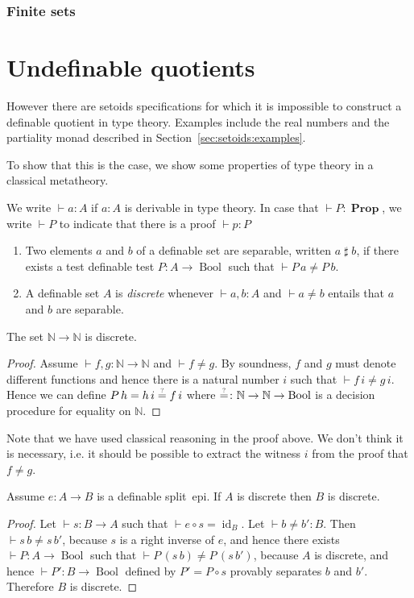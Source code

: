 \documentclass[envcountsame]{llncs}
\newcommand{\N}{\mathbb{N}}
\DeclareMathOperator{\Prop}{\mathbf{Prop}}
\DeclareMathOperator{\Bool}{Bool}
\DeclareMathOperator{\id}{id}
\newcommand{\eqqm}{\overset{\text{\tiny ?}}{=}}
\newcommand{\sep}{\mathrel{\sharp}}
\begin{document}
\subsubsection*{Finite sets}


\section{Undefinable quotients}
However there are setoids specifications for which it is impossible to construct a definable quotient in type theory. Examples include the real numbers and the partiality monad described in Section~\ref{sec:setoids:examples}.

To show that this is the case, we show some properties of type theory in a classical metatheory.

We write $\vdash a\colon A$ if $a\colon A$ is derivable in type theory. In case that $\vdash P\colon \Prop$, we write $\vdash P$ to indicate that there is a proof $\vdash p\colon P$
\begin{definition}\hfill
\begin{enumerate}
\item Two elements $a$ and $b$ of a definable set are separable, written $a \sep b$, if there exists a test definable test $P\colon A\to \Bool$ such that $\vdash P\,a \neq P\,b$.
\item A definable set $A$ is \emph{discrete} whenever $\vdash a, b\colon A$ and   $\vdash a\not= b$
entails that $a$ and $b$ are separable.
\end{enumerate}
\end{definition}
\begin{proposition}\label{prop:NtoNdiscrete}
The set $\N\to\N$ is discrete.
\end{proposition}
\begin{proof}
Assume $\vdash f, g\colon \N \to \N$ and $\vdash f\neq g$. By soundness, $f$ and $g$ must denote different functions and hence there is a natural number $i$ such that $\vdash f\,i\neq g\,i$. Hence we can define $P\,h = {h\,i} \eqqm {f\,i}$ where ${\eqqm}\colon \N\to\N\to\Bool$ is a decision procedure for equality on $\N$.
\end{proof}

Note that we have used classical reasoning in the proof above. We don't think it is necessary, i.e. it should be possible to extract the witness $i$ from the proof that $f\neq g$.

\begin{proposition}\label{prop:splitepidiscrete}
Assume $ e\colon A\to B$ is a definable split~epi.  If $A$ is discrete then $B$ is discrete.
\end{proposition}
\begin{proof}
Let $\vdash s\colon B\to A$ such that $\vdash e\circ s=\id_B$. Let $\vdash b\neq b'\colon B$. Then $\vdash s\,b\neq s\,b'$, because $s$ is a right inverse of $e$, and hence there exists $\vdash P\colon A\to\Bool$ such that $\vdash P\,(s\,b)\neq P\,(s\,b')$, because $A$ is discrete, and hence $\vdash P'\colon B\to\Bool$ defined by $P' = P\circ s$ provably separates $b$ and $b'$.
Therefore $B$ is discrete.
\end{proof}
\end{document}
